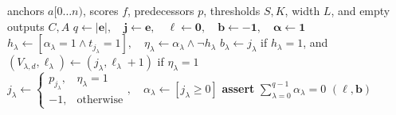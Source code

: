 \begin{algorithm}[H]
\caption{BioseqDB SIMD path collection and backtracking}
\label{alg:chaining-simd-backtrack}
\footnotesize
\begin{algorithmic}[1]
  \Require anchors \(a[0\ldots n)\), scores \(f\), predecessors \(p\),
    thresholds \(S,K\), width \(L\), and empty outputs \(C,A\)
    \State \(q\gets|\mathbf e|,\quad \mathbf j\gets\mathbf e,\quad
      \boldsymbol\ell\gets\mathbf0,\quad \mathbf b\gets-\mathbf1,\quad
      \boldsymbol\alpha\gets\mathbf1\)
      \State \(h_\lambda\gets
        [\alpha_\lambda=1\land t_{j_\lambda}=1],\quad
        \eta_\lambda\gets\alpha_\lambda\land\neg h_\lambda\) 
      \State \(b_\lambda\gets j_\lambda\) if \(h_\lambda=1\), and
        \((V_{\lambda,d},\ell_\lambda)\gets
        (j_\lambda,\ell_\lambda+1)\) if \(\eta_\lambda=1\)
      \State \(j_\lambda\gets
        \begin{cases}p_{j_\lambda},&\eta_\lambda=1\\-1,&\text{otherwise}
        \end{cases},\quad \alpha_\lambda\gets[j_\lambda\geq0]\)
    \EndFor
    \State \textbf{assert}
      \(\sum_{\lambda=0}^{q-1}\alpha_\lambda = 0\) 
    \State \Return \((\boldsymbol\ell,\mathbf b)\)
  \EndFunction


\end{algorithmic}
\end{algorithm}
